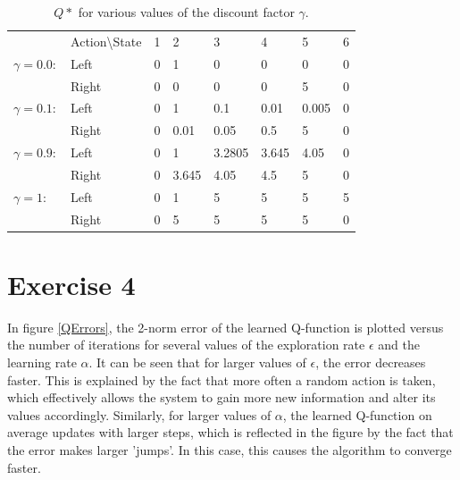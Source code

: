 \documentclass [a4paper] {report}
\begin{document}
	\begin{table}[H]
		\centering
		\caption{$Q*$ for various values of the discount factor $\gamma$.}
		\label{optQs}
		\begin{tabular}{ll|llllll}
						&  Action\textbackslash State    & 1 & 2 & 3 & 4 & 5 & 6 \\ \cmidrule{2-8}
	$\gamma=0.0:$		& Left 				& 0 & 1 & 0 & 0 & 0 & 0 \\ 
						& Right 			& 0 & 0 & 0 & 0 & 5 & 0 \\ \cmidrule{2-8}
	$\gamma=0.1:$		& Left 				& 0 & 1 & 0.1 & 0.01 & 0.005 & 0 \\ 
						& Right 			& 0 & 0.01 & 0.05 & 0.5 & 5 & 0 \\ \cmidrule{2-8}
	$\gamma=0.9:$		& Left 				& 0 & 1 & 3.2805 & 3.645 & 4.05 & 0 \\ 
						& Right 			& 0 & 3.645 & 4.05 & 4.5 & 5 & 0 \\ \cmidrule{2-8}
	$\gamma=1:$			& Left 				& 0 & 1 & 5 & 5 & 5 & 5 \\ 
						& Right 			& 0 & 5 & 5 & 5 & 5 & 0 \\ 
		\end{tabular}
	\end{table}

	\section*{Exercise 4}
	In figure \ref{QErrors}, the 2-norm error of the learned Q-function is plotted versus the number of iterations for several values of the exploration rate $\epsilon$ and the learning rate $\alpha$. It can be seen that for larger values of $\epsilon$, the error decreases faster. This is explained by the fact that more often a random action is taken, which effectively allows the system to gain more new information and alter its values accordingly. Similarly, for larger values of $\alpha$, the learned Q-function on average updates with larger steps, which is reflected in the figure by the fact that the error makes larger 'jumps'. In this case, this causes the algorithm to converge faster.
	
\end{document}
